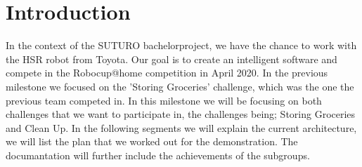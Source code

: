 \documentclass[main.tex]{subfiles}
\begin{document}
	\chapter{Introduction}
	In the context of the SUTURO bachelorproject, we have the chance to work with the HSR robot from Toyota. Our goal is to create an intelligent software and compete in the Robocup@home competition in April 2020. 
	In the previous milestone we focused on the 'Storing Groceries' challenge, which was the one the previous team competed in. In this milestone we will be focusing on both challenges that we want to participate in, the challenges being; Storing Groceries and Clean Up. 
	In the following segments we will explain the current architecture, we will list the plan that we worked out for the demonstration. The documantation will further include the achievements of the subgroups.
\end{document}
